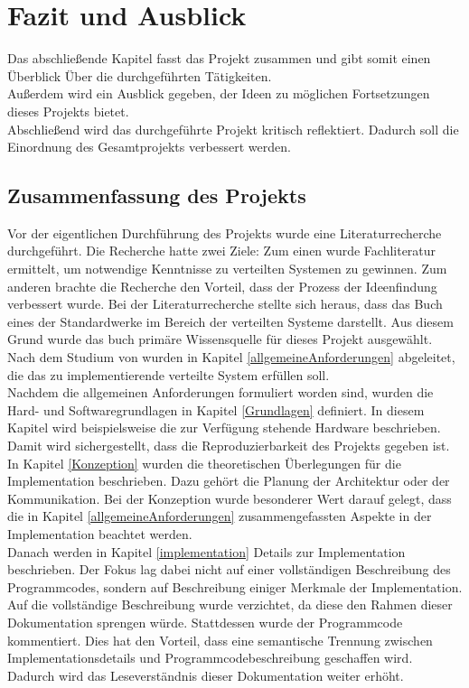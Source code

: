 \chapter{Fazit und Ausblick}
Das abschließende Kapitel fasst das Projekt zusammen und gibt somit einen Überblick Über die durchgeführten Tätigkeiten.\\
 Außerdem wird ein Ausblick gegeben, der Ideen zu möglichen Fortsetzungen dieses Projekts bietet. \\
 Abschließend wird das durchgeführte Projekt kritisch reflektiert. Dadurch soll die Einordnung des Gesamtprojekts verbessert werden.

\section{Zusammenfassung des Projekts}
Vor der eigentlichen Durchführung des Projekts wurde eine Literaturrecherche durchgeführt. Die Recherche hatte zwei Ziele: Zum einen wurde Fachliteratur ermittelt, um notwendige Kenntnisse zu verteilten Systemen zu gewinnen. Zum anderen brachte die Recherche den Vorteil, dass der Prozess der Ideenfindung verbessert wurde. Bei der Literaturrecherche stellte sich heraus, dass das Buch \citep{tanenbaum} eines der Standardwerke im Bereich der verteilten Systeme darstellt. Aus diesem Grund wurde das buch primäre Wissensquelle für dieses Projekt ausgewählt. \\
Nach dem Studium von \citep{tanenbaum} wurden in Kapitel \ref{allgemeineAnforderungen} abgeleitet, die das zu implementierende verteilte System erfüllen soll. \\
Nachdem die allgemeinen Anforderungen formuliert worden sind, wurden die Hard- und Softwaregrundlagen in Kapitel \ref{Grundlagen} definiert. In diesem Kapitel wird beispielsweise die zur Verfügung stehende Hardware beschrieben. Damit wird sichergestellt, dass die Reproduzierbarkeit des Projekts gegeben ist. \\
In Kapitel \ref{Konzeption} wurden die theoretischen Überlegungen für die Implementation beschrieben. Dazu gehört die Planung der Architektur oder der Kommunikation. Bei der Konzeption wurde besonderer Wert darauf gelegt, dass die in Kapitel \ref{allgemeineAnforderungen} zusammengefassten Aspekte in der Implementation beachtet werden. \\
Danach werden in Kapitel \ref{implementation} Details zur Implementation beschrieben. Der Fokus lag dabei nicht auf einer vollständigen Beschreibung des Programmcodes, sondern auf Beschreibung einiger Merkmale der Implementation. Auf die vollständige Beschreibung wurde verzichtet, da diese den Rahmen dieser Dokumentation sprengen würde. Stattdessen wurde der Programmcode kommentiert. Dies hat den Vorteil, dass eine semantische Trennung zwischen Implementationsdetails und Programmcodebeschreibung geschaffen wird. Dadurch wird das Leseverständnis dieser Dokumentation weiter erhöht. 


